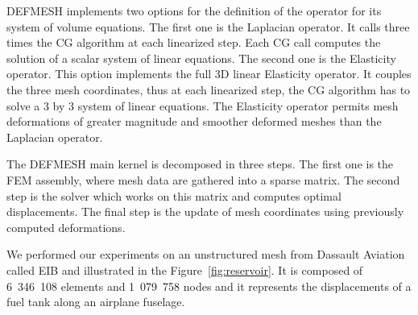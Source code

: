 \documentclass[10pt]{IOS-Book-Article}
\begin{document}
DEFMESH implements two options for the definition of the operator for its system of volume equations.
The first one is the Laplacian operator. It calls three times the CG algorithm at each linearized step.
Each CG call computes the solution of a scalar system of linear equations.
The second one is the Elasticity operator. This option implements the full 3D linear Elasticity operator.
It couples the three mesh coordinates, thus at each linearized step, the CG algorithm has to solve a 3 by 3 system of linear equations.
The Elasticity operator permits mesh deformations of greater magnitude and smoother deformed meshes than the Laplacian operator.

The DEFMESH main kernel is decomposed in three steps.
The first one is the FEM assembly, where mesh data are gathered into a sparse matrix.
The second step is the solver which works on this matrix and computes optimal displacements.
The final step is the update of mesh coordinates using previously computed deformations.

We performed our experiments on an unstructured mesh from Dassault Aviation called EIB and illustrated in the Figure~\ref{fig:reservoir}.
It is composed of 6~346~108 elements and 1~079~758 nodes and it represents the displacements of a fuel tank along an airplane fuselage.
\end{document}
